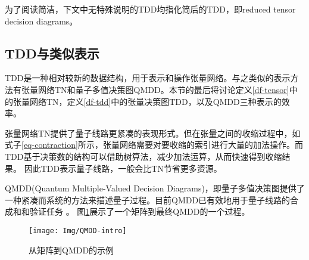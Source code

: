 为了阅读简洁，下文中无特殊说明的TDD均指化简后的TDD，即reduced tensor decision diagrams。


\subsection{TDD与类似表示}
\label{sec-compare}
TDD是一种相对较新的数据结构，用于表示和操作张量网络。与之类似的表示方法有张量网络TN和量子多值决策图QMDD。本节的最后将讨论定义\ref{df-tensor}中的张量网络TN，定义\ref{df-tdd}中的张量决策图TDD，以及QMDD\citep{1623982}三种表示的效率。

张量网络TN提供了量子线路更紧凑的表现形式。但在张量之间的收缩过程中，如式子\ref{eq-contraction}所示，张量网络需要对要收缩的索引进行大量的加法操作。而TDD基于决策数的结构可以借助树算法，减少加法运算，从而快速得到收缩结果。
因此TDD表示量子线路，一般会比TN节省更多资源。

QMDD(Quantum Multiple-Valued Decision Diagrams)，即量子多值决策图提供了一种紧凑而系统的方法来描述量子过程。目前QMDD已有效地用于量子线路的合成\citep{niemann2020advanced}和和验证任务
\citep{burgholzer2020verifying,burgholzer2020advanced}。
图\ref{fig:qmdd-basic}展示了一个矩阵到最终QMDD的一个过程。
\begin{figure}[htbp]
    \centering
    \texttt{[image: Img/QMDD-intro]}
    \caption{从矩阵到QMDD的示例\citep{1623982}}
    \label{fig:qmdd-basic}
\end{figure}

